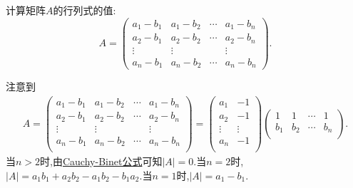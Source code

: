 \documentclass[../../main.tex]{subfiles}%
\begin{document}
\begin{example}
计算矩阵\(A\)的行列式的值:
\[
A = 
\begin{pmatrix}
a_1 - b_1 & a_1 - b_2 & \cdots & a_1 - b_n\\
a_2 - b_1 & a_2 - b_2 & \cdots & a_2 - b_n\\
\vdots & \vdots & & \vdots\\
a_n - b_1 & a_n - b_2 & \cdots & a_n - b_n
\end{pmatrix}.
\]
\end{example}
\begin{solution}
注意到\begin{align*}
A=\left( \begin{matrix}
a_1-b_1&		a_1-b_2&		\cdots&		a_1-b_n\\
a_2-b_1&		a_2-b_2&		\cdots&		a_2-b_n\\
\vdots&		\vdots&		&		\vdots\\
a_n-b_1&		a_n-b_2&		\cdots&		a_n-b_n\\
\end{matrix} \right) =\left( \begin{matrix}
a_1&		-1\\
a_2&		-1\\
\vdots&		\vdots\\
a_n&		-1\\
\end{matrix} \right) \left( \begin{matrix}
1&		1&		\cdots&		1\\
b_1&		b_2&		\cdots&		b_n\\
\end{matrix} \right) .
\end{align*}
当$n>2$时,由\hyperref[theorem:Cauchy-Binet公式]{Cauchy-Binet公式}可知$\left| A \right|=0$.当$n=2$时,$\left| A \right|=a_1b_1+a_2b_2-a_1b_2-b_1a_2$.当$n=1$时,$\left| A \right|=a_1-b_1$.


\end{solution}
\end{document}
